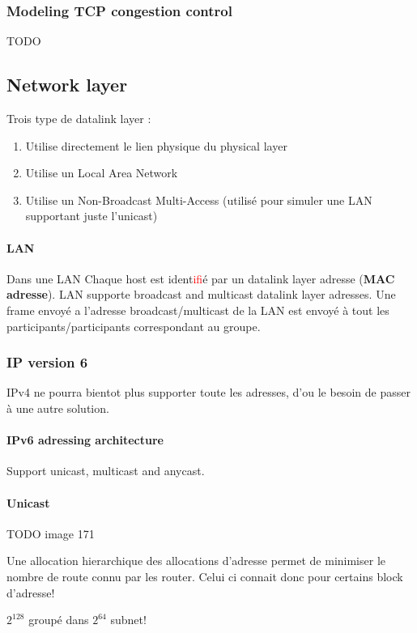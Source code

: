 \subsubsection{Modeling TCP congestion control}
TODO

\subsection{Network layer}
Trois type de datalink layer :
\begin{enumerate}
    \item Utilise directement le lien physique du physical layer
    \item Utilise un Local Area Network
    \item Utilise un Non-Broadcast Multi-Access (utilisé pour simuler une LAN supportant
        juste l'unicast)
\end{enumerate}

\paragraph{LAN} Dans une LAN Chaque host est ident\textcolor{red}{if}ié par un datalink layer adresse
(\textbf{MAC adresse}).
LAN supporte broadcast and multicast datalink layer adresses. Une frame envoyé a l'adresse
broadcast/multicast de la LAN est envoyé à tout les participants/participants correspondant
au groupe.

\subsubsection{IP version 6}
IPv4 ne pourra bientot plus supporter toute les adresses, d'ou le besoin
de passer à une autre solution.

\paragraph{IPv6 adressing architecture}
Support unicast, multicast and anycast.

\paragraph{Unicast}
TODO image 171

Une allocation hierarchique des allocations d'adresse permet de minimiser
le nombre de route connu par les router. Celui ci connait donc pour
certains block d'adresse!

$2^{128}$ groupé dans $2^{64}$ subnet!


